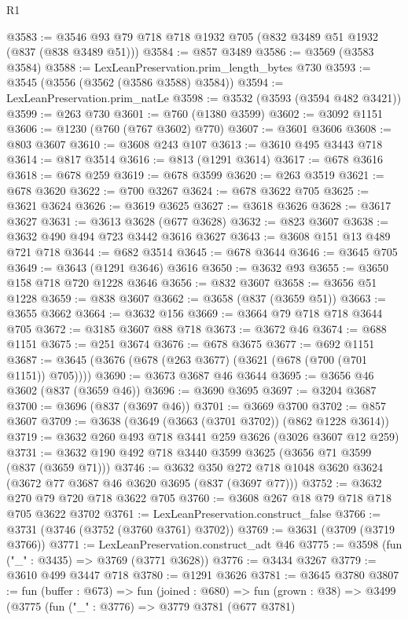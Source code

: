 \begin{lexlean}{R1}
\begin{coremodule}
@3583 := @3546 @93 @79 @718 @718 @1932 @705 (@832 @3489 @51 @1932 (@837 (@838 @3489 @51)))
@3584 := @857 @3489
@3586 := @3569 (@3583 @3584)
@3588 := LexLeanPreservation.prim_length_bytes @730
@3593 := @3545 (@3556 (@3562 (@3586 @3588) @3584))
@3594 := LexLeanPreservation.prim_natLe
@3598 := @3532 (@3593 (@3594 @482 @3421))
@3599 := @263 @730
@3601 := @760 (@1380 @3599)
@3602 := @3092 @1151
@3606 := @1230 (@760 (@767 @3602) @770)
@3607 := @3601 @3606
@3608 := @803 @3607
@3610 := @3608 @243 @107
@3613 := @3610 @495 @3443 @718
@3614 := @817 @3514
@3616 := @813 (@1291 @3614)
@3617 := @678 @3616
@3618 := @678 @259
@3619 := @678 @3599
@3620 := @263 @3519
@3621 := @678 @3620
@3622 := @700 @3267
@3624 := @678 @3622 @705
@3625 := @3621 @3624
@3626 := @3619 @3625
@3627 := @3618 @3626
@3628 := @3617 @3627
@3631 := @3613 @3628 (@677 @3628)
@3632 := @823 @3607
@3638 := @3632 @490 @494 @723 @3442 @3616 @3627
@3643 := @3608 @151 @13 @489 @721 @718
@3644 := @682 @3514
@3645 := @678 @3644
@3646 := @3645 @705
@3649 := @3643 (@1291 @3646) @3616
@3650 := @3632 @93
@3655 := @3650 @158 @718 @720 @1228 @3646
@3656 := @832 @3607
@3658 := @3656 @51 @1228
@3659 := @838 @3607
@3662 := @3658 (@837 (@3659 @51))
@3663 := @3655 @3662
@3664 := @3632 @156
@3669 := @3664 @79 @718 @718 @3644 @705
@3672 := @3185 @3607 @88 @718
@3673 := @3672 @46
@3674 := @688 @1151
@3675 := @251 @3674
@3676 := @678 @3675
@3677 := @692 @1151
@3687 := @3645 (@3676 (@678 (@263 @3677) (@3621 (@678 (@700 (@701 @1151)) @705))))
@3690 := @3673 @3687 @46 @3644
@3695 := @3656 @46 @3602 (@837 (@3659 @46))
@3696 := @3690 @3695
@3697 := @3204 @3687
@3700 := @3696 (@837 (@3697 @46))
@3701 := @3669 @3700
@3702 := @857 @3607
@3709 := @3638 (@3649 (@3663 (@3701 @3702)) (@862 @1228 @3614))
@3719 := @3632 @260 @493 @718 @3441 @259 @3626 (@3026 @3607 @12 @259)
@3731 := @3632 @190 @492 @718 @3440 @3599 @3625 (@3656 @71 @3599 (@837 (@3659 @71)))
@3746 := @3632 @350 @272 @718 @1048 @3620 @3624 (@3672 @77 @3687 @46 @3620 @3695 (@837 (@3697 @77)))
@3752 := @3632 @270 @79 @720 @718 @3622 @705
@3760 := @3608 @267 @18 @79 @718 @718 @705 @3622 @3702
@3761 := LexLeanPreservation.construct_false
@3766 := @3731 (@3746 (@3752 (@3760 @3761) @3702))
@3769 := @3631 (@3709 (@3719 @3766))
@3771 := LexLeanPreservation.construct_adt @46
@3775 := @3598 (fun ("_" : @3435) => @3769 (@3771 @3628))
@3776 := @3434 @3267
@3779 := @3610 @499 @3447 @718
@3780 := @1291 @3626
@3781 := @3645 @3780
@3807 := fun (buffer : @673) =>
  fun (joined : @680) =>
  fun (grown : @38) =>
  @3499
    (@3775
      (fun ("_" : @3776) =>
      @3779
        @3781
        (@677 @3781)

\end{coremodule}
\end{lexlean}
